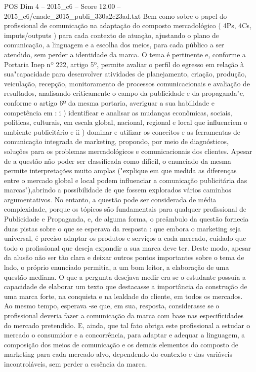 \begin{textsample}{POS Dim 4 – 2015\_c6 – Score 12.00 – 2015\_c6/enade\_2015\_publi\_330a2c23ad.txt}
Bem como sobre o papel do profissional de comunicação na adaptação do composto mercadológico ( 4Ps, 4Cs, imputs/outputs ) para cada contexto de atuação, ajustando o plano de comunicação, a linguagem e a escolha dos meios, para cada público a ser atendido, sem perder a identidade da marca.
O tema é pertinente e, conforme a Portaria Inep nº 222, artigo 5º, permite avaliar o perfil do egresso em relação à sua"capacidade para desenvolver atividades de planejamento, criação, produção, veiculação, recepção, monitoramento de processos comunicacionais e avaliação de resultados, analisando criticamente o campo da publicidade e da propaganda"e, conforme o artigo 6º da mesma portaria, averiguar a sua habilidade e competência em : i ) identificar e analisar as mudanças econômicas, sociais, políticas, culturais, em escala global, nacional, regional e local que influenciem o ambiente publicitário e ii ) dominar e utilizar os conceitos e as ferramentas de comunicação integrada de marketing, propondo, por meio de diagnósticos, soluções para os problemas mercadológicos e comunicacionais dos clientes.
Apesar de a questão não poder ser classificada como difícil, o enunciado da mesma permite interpretações muito amplas ("explique em que medida as diferenças entre o mercado global e local podem influenciar a comunicação publicitária das marcas"),abrindo a possibilidade de que fossem explorados vários caminhos argumentativos.
No entanto, a questão pode ser considerada de média complexidade, porque os tópicos são fundamentais para qualquer profissional de Publicidade e Propaganda, e, de alguma forma, o preâmbulo da questão fornecia duas pistas sobre o que se esperava da resposta : que embora o marketing seja universal, é preciso adaptar os produtos e serviços a cada mercado, cuidado que todo o profissional que deseja expandir a sua marca deve ter.
Deste modo, apesar da alusão não ser tão clara e deixar outros pontos importantes sobre o tema de lado, o próprio enunciado permitia, a um bom leitor, a elaboração de uma questão mediana.
O que a pergunta desejava medir era se o estudante possuía a capacidade de elaborar um texto que destacasse a importância da construção de uma marca forte, na conquista e na lealdade do cliente, em todos os mercados.
Ao mesmo tempo, esperava -se que, em sua, resposta, considerasse se o profissional deveria fazer a comunicação da marca com base nas especificidades do mercado pretendido.
E, ainda, que tal fato obriga este profissional a estudar o mercado o consumidor e a concorrência, para adaptar e adequar a linguagem, a composição dos meios de comunicação e os demais elementos do composto de marketing para cada mercado-alvo, dependendo do contexto e das variáveis incontroláveis, sem perder a essência da marca.

\end{textsample}
